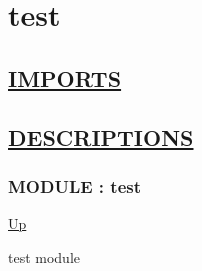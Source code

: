 \chapter*{test}
\hypertarget{ecldoc:toc:test}{}

\section*{\underline{IMPORTS}}

\section*{\underline{DESCRIPTIONS}}
\subsection*{MODULE : test}
\hypertarget{ecldoc:test}{}
\par
\begin{minipage}[t]{\textwidth}
\begin{flushleft}
  
\end{flushleft}
\end{minipage}
\hyperlink{ecldoc:toc:root}{Up} \\
\par
test module \\
\par
